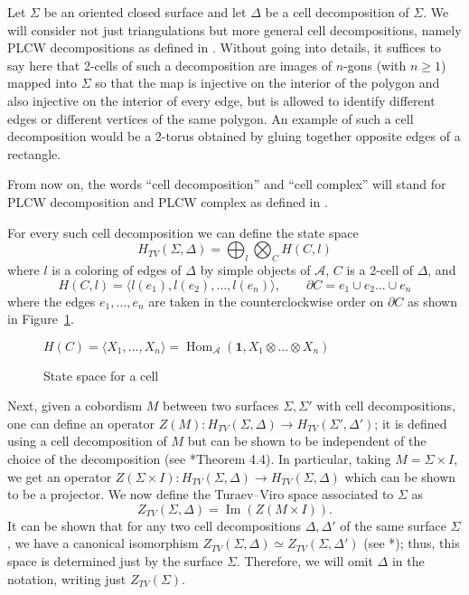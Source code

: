 \documentclass{amsart}
\theoremstyle{definition}
\theoremstyle{remark}
\numberwithin{equation}{section}
\newcommand{\firef}[1]{Figure~{\rm\ref{#1}}}
\newcommand{\del}{\partial}
\newcommand{\<}{\langle}
\renewcommand{\>}{\rangle}
\newcommand{\one}{\mathbf{1}}
\renewcommand{\i}{{\mathrm{i}}}   %
\newcommand{\A}{\mathcal{A}}      %
\newcommand{\De}{\Delta}
\newcommand{\Si}{\Sigma}
\newcommand{\HTV}{H_{TV}}
\newcommand{\ZTV}{Z_{TV}}
\DeclareMathOperator{\Hom}{Hom}
\DeclareMathOperator{\im}{Im}
\begin{document}
Let $\Si$ be an oriented  closed surface and let $\Delta$ be a cell
decomposition of $\Si$. We will consider not just triangulations but more
general cell decompositions, namely PLCW decompositions as defined in
. Without going into details, it suffices to say here that
2-cells of such a decomposition  are images of $n$-gons (with $n\ge 1$)
mapped  into $\Si$ so that the map is injective on the interior of the
polygon and also injective on the interior of every edge, but is allowed
to identify different edges or different vertices of the same polygon.
An example of such a cell decomposition would be a 2-torus obtained by
gluing together opposite edges of a rectangle. 

From now on, the words ``cell decomposition'' and ``cell complex'' will
stand for PLCW decomposition and PLCW complex as defined in .




For every such cell decomposition we can define the state space
$$
\HTV(\Si,\De)=\bigoplus_{l}\bigotimes_C H(C,l)
$$
where $l$ is a coloring of edges of $\De$ by simple objects of $\A$, $C$
is a 2-cell of $\Delta$, and
\begin{equation}
H(C,l)=\<l(e_1), l(e_2),\dots,
l(e_n)\>,\qquad
 \del C=e_1\cup e_2\dots\cup e_n
\end{equation}
where the edges $e_1,\dots, e_n$ are taken in the counterclockwise order on
$\del C$ as shown in \firef{f:state_space1}.
\begin{figure}[ht]
\qquad\qquad $H(C)=\<X_1, \dots,  X_n\>
=\Hom_\A(\one, X_1\otimes\dots\otimes X_n)$
\caption{State space for a cell}\label{f:state_space1}
\end{figure}


Next, given a cobordism $M$ between two surfaces $\Si, \Si'$ with cell
decompositions, one can define an operator $Z(M)\colon \HTV(\Si, \De)\to
\HTV(\Si',\De')$; it is defined using a cell decomposition of $M$ but can
be shown to be independent of the choice of the decomposition (see
*{Theorem 4.4}). In
particular, taking $M=\Si\times I$, we get an operator $Z(\Si\times
I)\colon \HTV(\Si,\De)\to\HTV(\Si,\De)$ which can be shown to be a
projector. We now define the Turaev--Viro space associated to $\Si$ as
$$
\ZTV(\Si, \De)=\im(Z(M\times I)).
$$
It can be shown that for any two cell decompositions $\De,\De'$ of the same
surface $\Si$, we have a canonical isomorphism $\ZTV(\Si, \De)\simeq
\ZTV(\Si, \De')$ (see *{}); thus, this space is
determined just by the surface $\Si$. Therefore, we will omit $\De$ in the
notation, writing just $\ZTV(\Si)$. 
\end{document}
